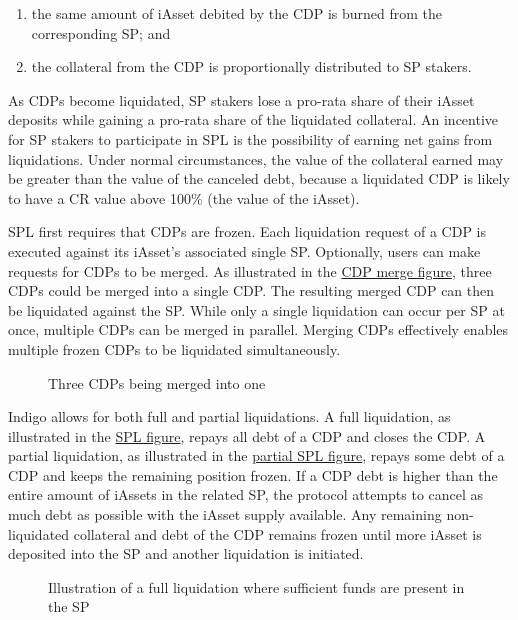 \documentclass{article}
\begin{document}
\begin{sloppypar}
\begin{enumerate}
\item
  the same amount of iAsset debited by the CDP is burned from the
  corresponding SP; and
\item
  the collateral from the CDP is proportionally distributed to SP
  stakers.
\end{enumerate}

As CDPs become liquidated, SP stakers lose a pro-rata share of their
iAsset deposits while gaining a pro-rata share of the liquidated
collateral. An incentive for SP stakers to participate in SPL is the
possibility of earning net gains from liquidations. Under normal
circumstances, the value of the collateral earned may be greater than
the value of the canceled debt, because a liquidated CDP is likely to
have a CR value above 100\% (the value of the iAsset).

SPL first requires that CDPs are frozen. Each liquidation request of a
CDP is executed against its iAsset's associated single SP. Optionally,
users can make requests for CDPs to be merged. As illustrated in the
\protect\hyperlink{cdp-merge-figure}{CDP merge figure}, three CDPs could
be merged into a single CDP. The resulting merged CDP can then be
liquidated against the SP. While only a single liquidation can occur per
SP at once, multiple CDPs can be merged in parallel. Merging CDPs
effectively enables multiple frozen CDPs to be liquidated
simultaneously.

\hypertarget{cdp-merge-figure}{%
\begin{figure}[htbp]
\centering

\caption{Three CDPs being merged into one}
\label{cdp-merge-figure}
\end{figure}}

Indigo allows for both full and partial liquidations. A full
liquidation, as illustrated in the \protect\hyperlink{spl-figure}{SPL
figure}, repays all debt of a CDP and closes the CDP. A partial
liquidation, as illustrated in the
\protect\hyperlink{spl-figure}{partial SPL figure}, repays some debt of
a CDP and keeps the remaining position frozen. If a CDP debt is higher
than the entire amount of iAssets in the related SP, the protocol
attempts to cancel as much debt as possible with the iAsset supply
available. Any remaining non-liquidated collateral and debt of the CDP
remains frozen until more iAsset is deposited into the SP and another
liquidation is initiated.

\hypertarget{spl-figure}{%
\begin{figure}[htbp]
\centering

\caption{Illustration of a full liquidation where sufficient funds are
present in the SP}
\label{spl-figure}
\end{figure}}


\end{sloppypar}
\end{document}
